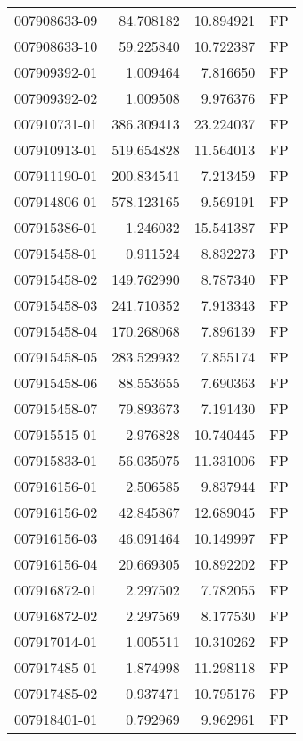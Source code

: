 \begin{tabular}{lrrl}
007908633-09 &   84.708182 &      10.894921 &   FP \\
007908633-10 &   59.225840 &      10.722387 &   FP \\
007909392-01 &    1.009464 &       7.816650 &   FP \\
007909392-02 &    1.009508 &       9.976376 &   FP \\
007910731-01 &  386.309413 &      23.224037 &   FP \\
007910913-01 &  519.654828 &      11.564013 &   FP \\
007911190-01 &  200.834541 &       7.213459 &   FP \\
007914806-01 &  578.123165 &       9.569191 &   FP \\
007915386-01 &    1.246032 &      15.541387 &   FP \\
007915458-01 &    0.911524 &       8.832273 &   FP \\
007915458-02 &  149.762990 &       8.787340 &   FP \\
007915458-03 &  241.710352 &       7.913343 &   FP \\
007915458-04 &  170.268068 &       7.896139 &   FP \\
007915458-05 &  283.529932 &       7.855174 &   FP \\
007915458-06 &   88.553655 &       7.690363 &   FP \\
007915458-07 &   79.893673 &       7.191430 &   FP \\
007915515-01 &    2.976828 &      10.740445 &   FP \\
007915833-01 &   56.035075 &      11.331006 &   FP \\
007916156-01 &    2.506585 &       9.837944 &   FP \\
007916156-02 &   42.845867 &      12.689045 &   FP \\
007916156-03 &   46.091464 &      10.149997 &   FP \\
007916156-04 &   20.669305 &      10.892202 &   FP \\
007916872-01 &    2.297502 &       7.782055 &   FP \\
007916872-02 &    2.297569 &       8.177530 &   FP \\
007917014-01 &    1.005511 &      10.310262 &   FP \\
007917485-01 &    1.874998 &      11.298118 &   FP \\
007917485-02 &    0.937471 &      10.795176 &   FP \\
007918401-01 &    0.792969 &       9.962961 &   FP \\

\end{tabular}

